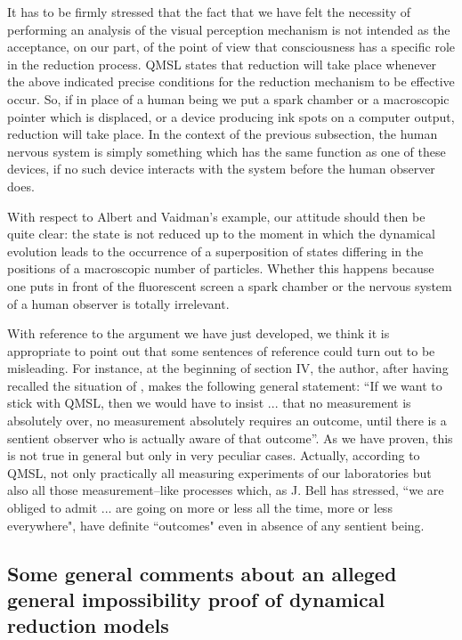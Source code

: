 \documentclass[10pt,a4paper]{article}
\begin{document}
It has to be firmly stressed that the fact that we have felt the
necessity of performing an analysis of the visual perception
mechanism is not intended as the acceptance, on our part, of the
point of view that consciousness has a specific role in the
reduction process. QMSL states that reduction will take place
whenever the above indicated precise conditions for the reduction
mechanism to be effective occur. So, if in place of a human being
we put a spark chamber or a macroscopic pointer which is
displaced, or a device producing ink spots on a computer output,
reduction will take place. In the context of the previous
subsection, the human nervous system is simply something which has
the same function as one of these devices, if no such device
interacts with the system before the human observer does.

With respect to Albert and Vaidman's example, our attitude should
then be quite clear: the state is not reduced up to the moment in
which the dynamical evolution leads to the occurrence of a
superposition of states differing in the positions of a
macroscopic number of particles. Whether this happens because one
puts in front of the fluorescent screen a spark chamber or the
nervous system of a human observer is totally irrelevant.

With reference to the argument we have just developed, we think it
is appropriate to point out that some sentences of reference
\cite{ap} could turn out to be misleading. For instance, at the
beginning of section IV, the author, after having recalled the
situation of \cite{avp}, makes the following general statement:
``If we want to stick with QMSL, then we would have to insist ...
that no measurement is absolutely over, no measurement absolutely
requires an outcome, until there is a sentient observer who is
actually aware of that outcome''. As we have proven, this is not
true in general but only in very peculiar cases. Actually,
according to QMSL, not only practically all measuring experiments
of our laboratories but also all those measurement--like processes
which, as J. Bell \cite{bellam} has stressed, ``we are obliged to
admit ... are going on more or less all the time, more or less
everywhere", have definite ``outcomes" even in absence of any
sentient being.


\subsection[General comments on the impossibility proof of QMSL]{Some
general comments about an alleged general impossibility proof of
dynamical reduction models} \label{sec145}
\end{document}
